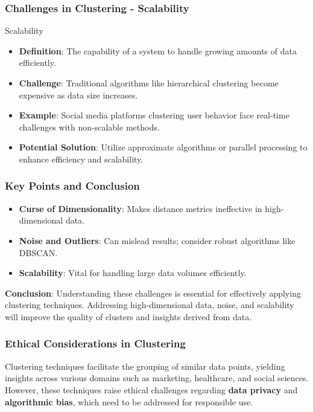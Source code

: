 \documentclass[aspectratio=169]{beamer}
\begin{document}
\begin{frame}[fragile]
    \frametitle{Challenges in Clustering - Scalability}
    \begin{block}{Scalability}
        \begin{itemize}
            \item \textbf{Definition}: The capability of a system to handle growing amounts of data efficiently.
            \item \textbf{Challenge}: Traditional algorithms like hierarchical clustering become expensive as data size increases.
            \item \textbf{Example}: Social media platforms clustering user behavior face real-time challenges with non-scalable methods.
            \item \textbf{Potential Solution}: Utilize approximate algorithms or parallel processing to enhance efficiency and scalability.
        \end{itemize}
    \end{block}
\end{frame}

\begin{frame}[fragile]
    \frametitle{Key Points and Conclusion}
    \begin{itemize}
        \item \textbf{Curse of Dimensionality}: Makes distance metrics ineffective in high-dimensional data.
        \item \textbf{Noise and Outliers}: Can mislead results; consider robust algorithms like DBSCAN.
        \item \textbf{Scalability}: Vital for handling large data volumes efficiently.
    \end{itemize}

    \textbf{Conclusion}: Understanding these challenges is essential for effectively applying clustering techniques. Addressing high-dimensional data, noise, and scalability will improve the quality of clusters and insights derived from data.
\end{frame}

\begin{frame}[fragile]
    \frametitle{Ethical Considerations in Clustering}
    Clustering techniques facilitate the grouping of similar data points, yielding insights across various domains such as marketing, healthcare, and social sciences. 
    However, these techniques raise ethical challenges regarding \textbf{data privacy} and \textbf{algorithmic bias}, which need to be addressed for responsible use.
\end{frame}
\end{document}
